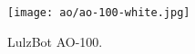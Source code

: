 

\begin{figure}[h!]
\texttt{[image: ao/ao-100-white.jpg]}
 \caption{LulzBot AO-100.}
 \label{fig:ao-100-1-white}
\end{figure}


